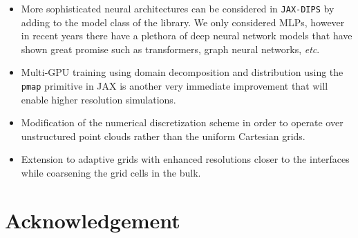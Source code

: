 \documentclass{elsarticle}
\begin{document}
\begin{itemize}

\item  More sophisticated neural architectures can be considered in \texttt{JAX-DIPS} by adding to the model class of the library. We only considered MLPs, however in recent years there have a plethora of deep neural network models that have shown great promise such as transformers, graph neural networks, \textit{etc}.

\item Multi-GPU training using domain decomposition and distribution using the \texttt{pmap} primitive in JAX is another very immediate improvement that will enable higher resolution simulations.

\item Modification of the numerical discretization scheme in order to operate over unstructured point clouds rather than the uniform Cartesian grids.

\item Extension to adaptive grids with enhanced resolutions closer to the interfaces while coarsening the grid cells in the bulk.


\end{itemize}

\section*{Acknowledgement}



\newpage


\end{document}
